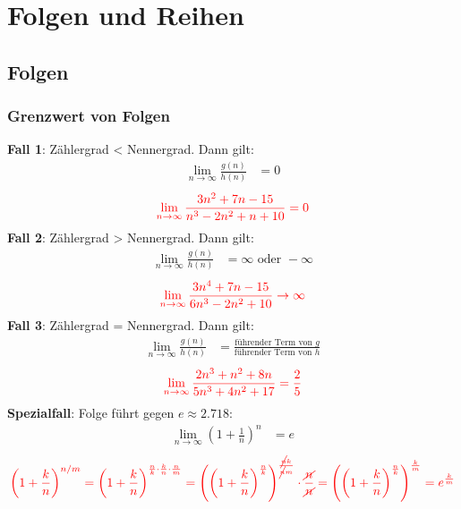 \section{Folgen und Reihen}
\subsection{Folgen}

\subsubsection{Grenzwert von Folgen}
\textbf{Fall 1}: Zählergrad < Nennergrad. Dann gilt:
\begin{align*}
	\lim_{n \to \infty} \frac{g(n)}{h(n)} & = 0
\end{align*}
\begin{align*}
	\textcolor{red}{\lim_{n \to \infty} \frac{3n^2 + 7n - 15}{n^3 - 2n^2 + n + 10} = 0}
\end{align*}
\textbf{Fall 2}: Zählergrad > Nennergrad. Dann gilt:
\begin{align*}
	\lim_{n \to \infty} \frac{g(n)}{h(n)} & = \infty \text{ oder } -\infty
\end{align*}
\begin{align*}
	\textcolor{red}{\lim_{n \to \infty} \frac{3n^4 + 7n - 15}{6n^3 - 2n^2 + 10} \to \infty}
\end{align*}
\textbf{Fall 3}: Zählergrad = Nennergrad. Dann gilt:
\begin{align*}
	\lim_{n \to \infty} \frac{g(n)}{h(n)} & = \frac{\text{führender Term von } g}{\text{führender Term von } h}
\end{align*}
\begin{align*}
	\textcolor{red}{\lim_{n \to \infty} \frac{2n^3 + n^2 + 8n}{5n^3 + 4n^2 + 17} = \frac{2}{5}}
\end{align*}
\textbf{Spezialfall}: Folge führt gegen $e \approx 2.718$:
\begin{align*}
	\lim_{n \to \infty} (1+\frac{1}{n})^n & = e
\end{align*}
\begin{align*}
	\textcolor{red}{\left(1 + \frac{k}{n}\right)^{n/m} = \left(1 + \frac{k}{n}\right)^{\frac{n}{k} \cdot \frac{k}{n} \cdot \frac{n}{m}} = \left(\left(1 + \frac{k}{n}\right)^{\frac{n}{k}}\right)^{\frac{\cancel{n}k}{\cancel{n}m}} \cdot \frac{\cancel{n}}{\cancel{n}} = \left(\left(1 + \frac{k}{n}\right)^{\frac{n}{k}}\right)^{\frac{k}{m}} = e^{\frac{k}{m}}}
\end{align*}

